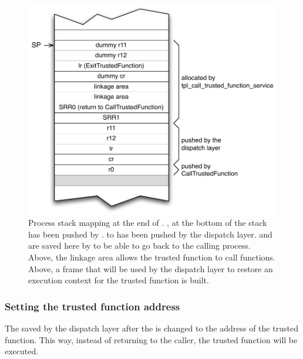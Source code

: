 \begin{figure}[htbp] %
\begin{minipage}{0.65\textwidth}
    \centering
  \includegraphics[scale=.6]{pictures/TFStack1} 
\end{minipage}
\begin{minipage}{0.35\textwidth}
  \caption{Process stack mapping at the end of . , at the bottom of the stack has been pushed by .  to  has been pushed by the dispatch layer.  and  are saved here by  to be able to go back to the calling process. Above, the linkage area allows the trusted function to call functions. Above, a frame that will be used by the dispatch layer to restore an execution context for the trusted function is built.}\label{fig:tfstackmapping}
\end{minipage}
\end{figure}

\subsubsection{Setting the trusted function address}

The  saved by the dispatch layer after the  is changed to the address of the trusted function. This way, instead of returning to the caller, the trusted function will be executed.

